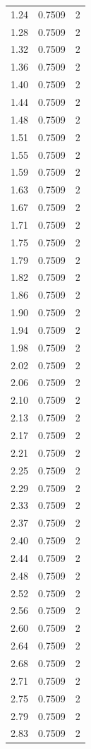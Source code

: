\begin{longtable}{lrr}
  1.24 & 0.7509 & 2 \\
  1.28 & 0.7509 & 2 \\
  1.32 & 0.7509 & 2 \\
  1.36 & 0.7509 & 2 \\
  1.40 & 0.7509 & 2 \\
  1.44 & 0.7509 & 2 \\
  1.48 & 0.7509 & 2 \\
  1.51 & 0.7509 & 2 \\
  1.55 & 0.7509 & 2 \\
  1.59 & 0.7509 & 2 \\
  1.63 & 0.7509 & 2 \\
  1.67 & 0.7509 & 2 \\
  1.71 & 0.7509 & 2 \\
  1.75 & 0.7509 & 2 \\
  1.79 & 0.7509 & 2 \\
  1.82 & 0.7509 & 2 \\
  1.86 & 0.7509 & 2 \\
  1.90 & 0.7509 & 2 \\
  1.94 & 0.7509 & 2 \\
  1.98 & 0.7509 & 2 \\
  2.02 & 0.7509 & 2 \\
  2.06 & 0.7509 & 2 \\
  2.10 & 0.7509 & 2 \\
  2.13 & 0.7509 & 2 \\
  2.17 & 0.7509 & 2 \\
  2.21 & 0.7509 & 2 \\
  2.25 & 0.7509 & 2 \\
  2.29 & 0.7509 & 2 \\
  2.33 & 0.7509 & 2 \\
  2.37 & 0.7509 & 2 \\
  2.40 & 0.7509 & 2 \\
  2.44 & 0.7509 & 2 \\
  2.48 & 0.7509 & 2 \\
  2.52 & 0.7509 & 2 \\
  2.56 & 0.7509 & 2 \\
  2.60 & 0.7509 & 2 \\
  2.64 & 0.7509 & 2 \\
  2.68 & 0.7509 & 2 \\
  2.71 & 0.7509 & 2 \\
  2.75 & 0.7509 & 2 \\
  2.79 & 0.7509 & 2 \\
  2.83 & 0.7509 & 2 \\

\end{longtable}
